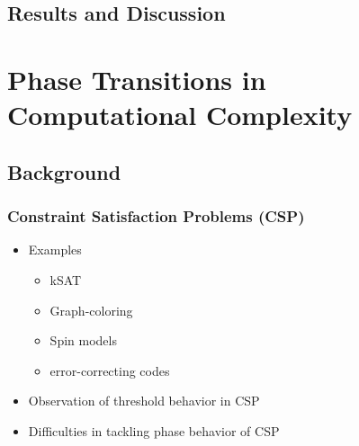 \documentclass{umthesis}          %
\begin{document}
\section{Results and Discussion}
\label{sec-4.4}

\chapter{Phase Transitions in Computational Complexity}
\label{sec-5}

\section{Background}
\label{sec-5.1}

\subsection{Constraint Satisfaction Problems (CSP)}
\label{sec-5.1.1}

\begin{itemize}

\item Examples\\
\label{sec-5.1.1.1}

\begin{itemize}

\item kSAT\\
\label{sec-5.1.1.1.1}


\item Graph-coloring\\
\label{sec-5.1.1.1.2}


\item Spin models\\
\label{sec-5.1.1.1.3}


\item error-correcting codes\\
\label{sec-5.1.1.1.4}

\end{itemize} %

\item Observation of threshold behavior in CSP\\
\label{sec-5.1.1.2}


\item Difficulties in tackling phase behavior of CSP\\
\label{sec-5.1.1.3}

\end{itemize} %
\end{document}
